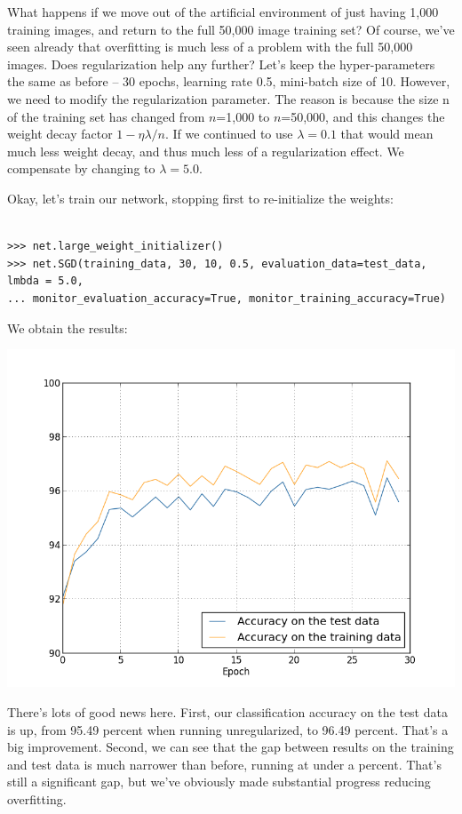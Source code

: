 \documentclass[a4paper,twoside,10pt]{book}
\begin{document}
What happens if we move out of the artificial environment of just having 1,000 training images, and return to the full 50,000 image training set? Of course, we've seen already that overfitting is much less of a problem with the full 50,000 images. Does regularization help any further? Let's keep the hyper-parameters the same as before -- 30 epochs, learning rate 0.5, mini-batch size of 10. However, we need to modify the regularization parameter. The reason is because the size n of the training set has changed from $n$=1,000 to $n$=50,000, and this changes the weight decay factor $1−\eta\lambda/n$. If we continued to use $\lambda =0.1$ that would mean much less weight decay, and thus much less of a regularization effect. We compensate by changing to $\lambda =5.0$.

Okay, let's train our network, stopping first to re-initialize the weights:

\begin{lstlisting}

>>> net.large_weight_initializer()
>>> net.SGD(training_data, 30, 10, 0.5, evaluation_data=test_data, lmbda = 5.0,
... monitor_evaluation_accuracy=True, monitor_training_accuracy=True)

\end{lstlisting}
We obtain the results:
\begin{center}
	\includegraphics[width=0.7\linewidth]{figures/ch3/regularized_full}
\end{center}
There's lots of good news here. First, our classification accuracy on the test data is up, from 95.49 percent when running unregularized, to 96.49 percent. That's a big improvement. Second, we can see that the gap between results on the training and test data is much narrower than before, running at under a percent. That's still a significant gap, but we've obviously made substantial progress reducing overfitting.
\end{document}
